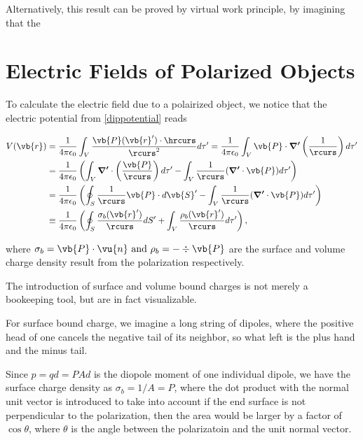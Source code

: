 \documentclass[english,a4paper,12pt]{report}
\begin{document}
Alternatively, this result can be proved by virtual work principle, by imagining that the 

\section{Electric Fields of Polarized Objects}

To calculate the electric field due to a polairized object, we notice that the electric potential from \cref{dippotential} reads

\begin{equation}
    \begin{aligned} 
    V(\vb{r} ) &= \frac{1}{4\pi \epsilon_0} \int_{V}^{} \frac{\vb{P} (\vb{r} ')\cdot \hrcurs }{\rcurs ^2}d\tau ' = \frac{1}{4\pi \epsilon_0} \int_{V}^{} \vb{P} \cdot \boldsymbol{\nabla '}\left( \frac{1}{\rcurs }  \right) d\tau ' \\
    &= \frac{1}{4\pi \epsilon_0} \left( \int_{V}^{} \boldsymbol{\nabla '} \cdot \left( \frac{\vb{P} }{\rcurs }  \right) d\tau ' - \int_{V}^{} \frac{1}{\rcurs } (\boldsymbol{\nabla '} \cdot \vb{P}  ) d\tau ' \right) \\
    &= \frac{1}{4\pi \epsilon_0} \left( \oint_{S} \frac{1}{\rcurs }\vb{P} \cdot d\vb{S} '  - \int_{V}^{} \frac{1}{\rcurs } (\boldsymbol{\nabla '} \cdot \vb{P}  ) d\tau ' \right) \\
    &\equiv  \frac{1}{4\pi \epsilon_0} \left( \oint_{S} \frac{\sigma _{b}(\vb{r} ') }{\rcurs } dS' + \int_{V}^{} \frac{\rho _{b} (\vb{r} ')}{\rcurs } d\tau ' \right),
    \end{aligned} 
\end{equation}

where \(\sigma _{b} = \vb{P} \cdot \vu{n} \text { and } \rho _{b} = - \div{\vb{P} } \) are the surface and volume charge density result from the polarization respectively.

The introduction of surface and volume bound charges is not merely a bookeeping tool, but are in fact visualizable. 

For surface bound charge, we imagine a long string of dipoles, where the positive head of one cancels the negative tail of its neighbor, so what left is the plus hand and the minus tail.

Since \(p = qd = PAd\) is the diopole moment of one individual dipole, we have the surface charge density as \(\sigma _{b} = 1 /A = P\), where the dot product with the normal unit vector is introduced to take into account if the end surface is not perpendicular to the polarization, then the area would be larger by a factor of \(\cos \theta \), where \(\theta \) is the angle between the polarizatoin and the unit normal vector.
\end{document}
